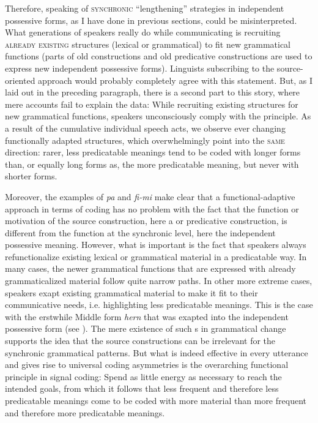 \documentclass[output=paper]{langsci/langscibook}
\begin{document}
Therefore, speaking of \textsc{synchronic} “lengthening” strategies in independent possessive forms, as I have done in previous sections, could be misinterpreted. What generations of speakers really do while communicating is recruiting \textsc{already} \textsc{existing} structures (lexical or grammatical) to fit new grammatical functions (parts of old  constructions and old predicative constructions are used to express new independent possessive forms). Linguists subscribing to the source-oriented approach would probably completely agree with this statement. But, as I laid out in the preceding paragraph, there is a second part to this story, where mere  accounts fail to explain the data: While recruiting existing structures for new grammatical functions, speakers unconsciously comply with the  principle. As a result of the cumulative individual speech acts, we observe ever changing functionally adapted structures, which overwhelmingly point into the \textsc{same} direction: rarer, less predicatable meanings tend to be coded with longer forms than, or equally long forms as, the more predicatable meaning, but never with shorter forms. 

Moreover, the examples of  \textit{pa} and  \textit{fi-mi} make clear that a functional-adaptive approach in terms of coding  has no problem with the fact that the function or motivation of the source construction, here a  or predicative construction, is different from the function at the synchronic level, here the independent possessive meaning. However, what is important is the fact that speakers always refunctionalize existing lexical or grammatical material in a predicatable way. In many cases, the newer grammatical functions that are expressed with already grammaticalized material follow quite narrow  paths. In other more extreme cases, speakers exapt existing grammatical material to make it fit to their communicative needs, i.e. highlighting less predicatable meanings. This is the case with the erstwhile Middle    form \textit{hern} that was exapted into the independent possessive form (see ). The mere existence of such s in grammatical change supports the idea that the source constructions can be irrelevant for the synchronic grammatical patterns. But what is indeed effective in every utterance and gives rise to universal coding asymmetries is the overarching functional  principle in signal coding: Spend as little energy as necessary to reach the intended goals, from which it follows that less frequent and therefore less predicatable meanings come to be coded with more material than more frequent and therefore more predicatable meanings.
\end{document}
